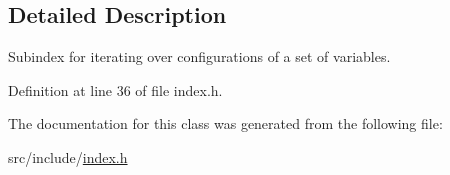 \subsection{Detailed Description}
Subindex for iterating over configurations of a set of variables. 

Definition at line 36 of file index.\+h.



The documentation for this class was generated from the following file\+:\begin{DoxyCompactItemize}
\item 
src/include/\hyperlink{index_8h}{index.\+h}\end{DoxyCompactItemize}
